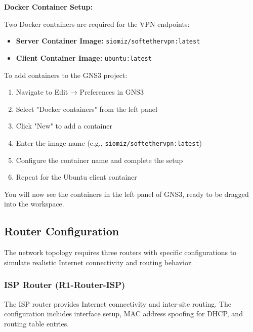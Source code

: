 \noindent
\textbf{Docker Container Setup:}

\noindent
Two Docker containers are required for the VPN endpoints:

\begin{itemize}
    \item \textbf{Server Container Image:} \texttt{siomiz/softethervpn:latest}
    \item \textbf{Client Container Image:} \texttt{ubuntu:latest}
\end{itemize}

\noindent
To add containers to the GNS3 project:

\begin{enumerate}
    \item Navigate to Edit → Preferences in GNS3
    \item Select "Docker containers" from the left panel
    \item Click "New" to add a container
    \item Enter the image name (e.g., \texttt{siomiz/softethervpn:latest})
    \item Configure the container name and complete the setup
    \item Repeat for the Ubuntu client container
\end{enumerate}

\noindent
You will now see the containers in the left panel of GNS3, ready to be dragged into the workspace.

\subsection{Router Configuration}

The network topology requires three routers with specific configurations to simulate realistic Internet connectivity and routing behavior.

\subsubsection{ISP Router (R1-Router-ISP)}

The ISP router provides Internet connectivity and inter-site routing. The configuration includes interface setup, MAC address spoofing for DHCP, and routing table entries.

